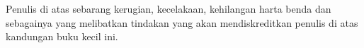 \chapter{\color{red}{PENAFIAN}}

Penulis {} di atas sebarang kerugian, kecelakaan, kehilangan harta benda dan sebagainya yang melibatkan tindakan yang akan mendiskreditkan penulis
 di atas kandungan buku kecil ini.